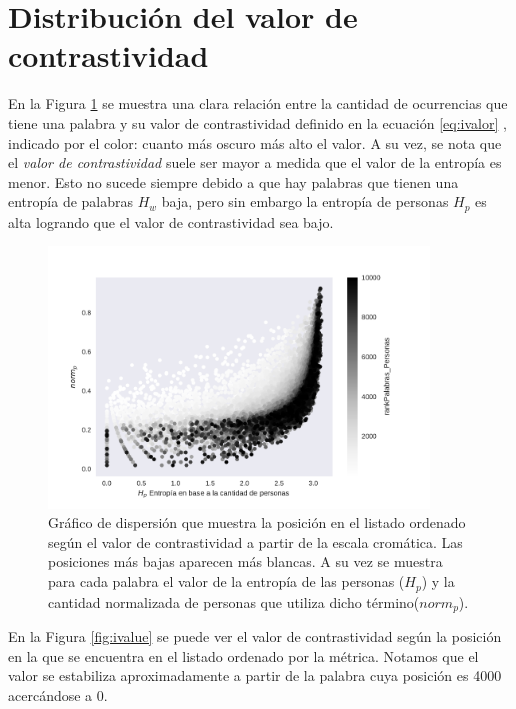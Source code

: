 \section{Distribución del valor de contrastividad}
\label{sec:ValorDeLaInformacion}
En la Figura \ref{fig:infoValue} se muestra una clara relación entre la cantidad de ocurrencias que tiene una palabra y su valor de contrastividad definido en la ecuación \ref{eq:ivalor} , indicado por el color: cuanto más oscuro más alto el valor. A su vez, se nota que el \textit{valor de contrastividad} suele ser mayor a medida que el valor de la entropía es menor. Esto no sucede siempre debido a que hay palabras que tienen una entropía de palabras $H_w$ baja, pero sin embargo la entropía de personas $H_p$ es alta logrando que el valor de contrastividad sea bajo.

\begin{figure}[h]
\centering
\includegraphics[width=0.9\textwidth]{./images/entropiaPersonasxNormCantPersonas.pdf}
\caption{Gráfico de dispersión que muestra la posición en el listado ordenado según el valor de contrastividad a partir de la escala cromática. Las posiciones más bajas aparecen más blancas. A su vez se muestra para cada palabra el valor de la entropía de las personas ($H_p$) y la cantidad normalizada de personas que utiliza dicho término($norm_p$). } 
\label{fig:infoValue} 
\end{figure}

En la Figura \ref{fig:ivalue} se puede ver el valor de contrastividad según la posición en la que se encuentra en el listado ordenado por la métrica. Notamos que el valor se estabiliza aproximadamente a partir de la palabra cuya posición es 4000 acercándose a 0.


